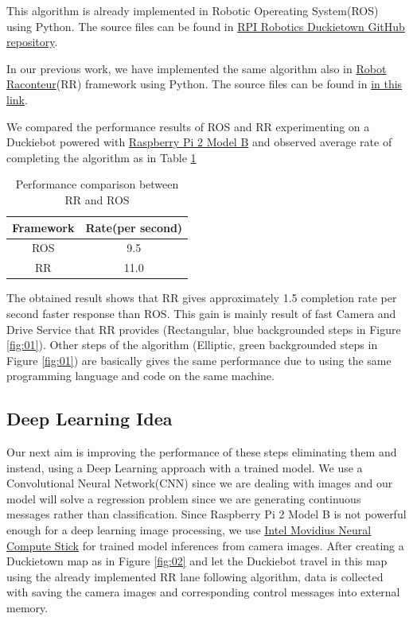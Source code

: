 \documentclass[11pt,letterpaper]{article}
\begin{document}
	This algorithm is already implemented in Robotic Opereating System(ROS) using Python. The source files can be found in \href{https://github.com/rpiRobotics/duckietown/tree/master/catkin_ws/src}{RPI Robotics Duckietown GitHub repository}. 
	
	In our previous work, we have implemented the same algorithm also in \href{https://robotraconteur.com/}{Robot Raconteur}(RR) framework using Python. The source files can be found in \href{https://github.com/burakaksoy/DuckiebotRR}{in this link}.  
	
	We compared the performance results of ROS and RR experimenting on a Duckiebot powered with \href{https://www.raspberrypi.org/products/raspberry-pi-2-model-b/}{Raspberry Pi 2 Model B} and observed average rate of completing the algorithm as in Table \ref{table:1}
	
	\begin{table}[h!]
	\centering
	\begin{tabular}{||c c||} 
		\hline
		Framework & Rate(per second) \\ [0.5ex] 
		\hline\hline
		ROS &  9.5\\ 
		\hline
		RR & 11.0  \\
		\hline
	\end{tabular}
	\caption{Performance comparison between RR and ROS}
	\label{table:1}
	\end{table}
	
	The obtained result shows that RR gives approximately 1.5 completion rate per second faster response than ROS. This gain is mainly result of fast Camera and Drive Service that RR provides (Rectangular, blue backgrounded steps in Figure \ref{fig:01}). Other steps of the algorithm (Elliptic, green backgrounded steps in Figure \ref{fig:01}) are basically gives the same performance due to using the same programming language and code on the same machine.
	
	\subsection{Deep Learning Idea}
	
	Our next aim is improving the performance of these steps eliminating them and instead, using a Deep Learning approach with a trained model. We use a Convolutional Neural Network(CNN) since we are dealing with images and our model will solve a regression problem since we are generating continuous messages rather than classification. Since Raspberry Pi 2 Model B is not powerful enough for a deep learning image processing, we  use \href{https://movidius.github.io/ncsdk/ncs.html}{Intel Movidius Neural Compute Stick} for trained model inferences from camera images. After creating a Duckietown map as in Figure \ref{fig:02} and let the Duckiebot travel in this map using the already implemented RR lane following algorithm, data is collected with saving the camera images and corresponding control messages into external memory. 
	
\end{document}
